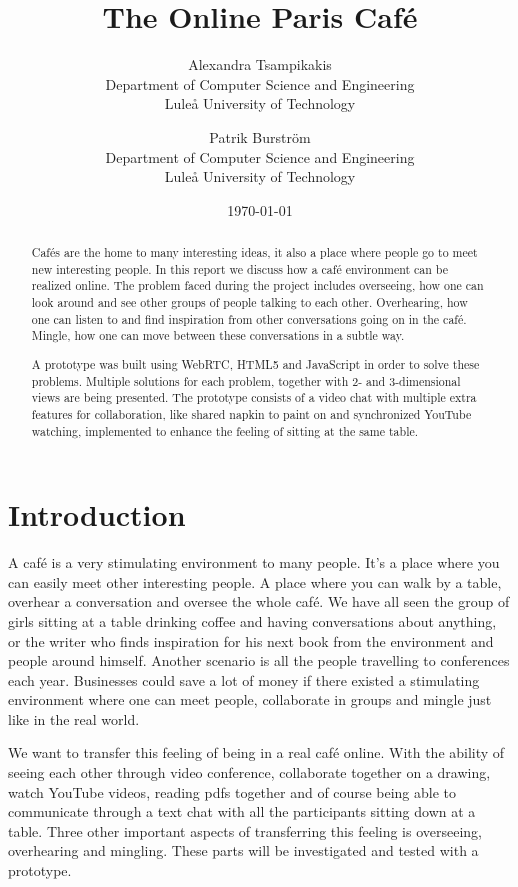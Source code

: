 \documentclass[12pt, titlepage]{article}
\title{The Online Paris Café}
\author{
        Alexandra Tsampikakis \\
                Department of Computer Science and Engineering\\
        Luleå University of Technology\\
            \and
        Patrik Burström\\
                Department of Computer Science and Engineering\\
        Luleå University of Technology\\
}
\date{\today}
\begin{document}
\newpage
\begin{abstract}
Cafés are the home to many interesting ideas, it also a place where people go to meet new interesting people. In this report we discuss how a café environment can be realized online. The problem faced during the project includes overseeing, how one can look around and see other groups of people talking to each other. Overhearing, how one can listen to and find inspiration from other conversations going on in the café. Mingle, how one can move between these conversations in a subtle way.

A prototype was built using WebRTC, HTML5 and JavaScript in order to solve these problems. Multiple solutions for each problem, together with 2- and 3-dimensional views are being presented. The prototype consists of a video chat with multiple extra features for collaboration, like shared napkin to paint on and  synchronized YouTube watching, implemented to enhance the feeling of sitting at the same table. 
\end{abstract}
\tableofcontents
\clearpage
\section{Introduction}
A café is a very stimulating environment to many people. It’s a place where you can easily meet other interesting people. A place where you can walk by a table, overhear a conversation and oversee the whole café. We have all seen the group of girls sitting at a table drinking coffee and having conversations about anything, or the writer who finds inspiration for his next book from the environment and people around himself. Another scenario is all the people travelling to conferences each year. Businesses could save a lot of money if there existed a stimulating environment where one can meet people, collaborate in groups and mingle just like in the real world.

We want to transfer this feeling of being in a real café online. With the ability of seeing each other through video conference, collaborate together on a drawing, watch YouTube videos, reading pdfs together and of course being able to communicate through a text chat with all the participants sitting down at a table. Three other important aspects of transferring this feeling is overseeing, overhearing and mingling. These parts will be investigated and tested with a prototype.
\end{document}
